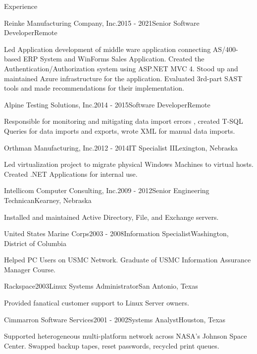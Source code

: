 \documentclass{resume} %
\begin{document}
\begin{rSection}{Experience}
\begin{rSubsection}{Reinke Manufacturing Company, Inc.}{2015 - 2021}{Senior Software Developer}{Remote} 
\item Led Application development of middle ware application connecting AS/400-based ERP System and WinForms Sales Application. Created the Authentication/Authorization system using ASP.NET MVC 4. Stood up and maintained Azure infrastructure for the application. Evaluated 3rd-part SAST tools and made recommendations for their implementation.
\end{rSubsection}

\begin{rSubsection}{Alpine Testing Solutions, Inc.}{2014 - 2015}{Software Developer}{Remote}
\item Responsible for monitoring and mitigating data import errors , created T-SQL Queries for data imports and exports, wrote XML for manual data imports.
\end{rSubsection}

\begin{rSubsection}{Orthman Manufacturing, Inc.}{2012 - 2014}{IT Specialist II}{Lexington, Nebraska}
\item Led virtualization project to migrate physical Windows Machines to virtual hosts. Created .NET Applications for internal use.
\end{rSubsection}

\begin{rSubsection}{Intellicom Computer Consulting, Inc.}{2009 - 2012}{Senior Engineering Technican}{Kearney, Nebraska}
\item Installed and maintained Active Directory, File, and Exchange servers. 
\end{rSubsection}

\begin{rSubsection}{United States Marine Corps}{2003 - 2008}{Information Specialist}{Washington, District of Columbia}
\item Helped PC Users on USMC Network. Graduate of USMC Information Assurance Manager Course.
\end{rSubsection}

\begin{rSubsection}{Rackspace}{2003}{Linux Systems Administrator}{San Antonio, Texas}
\item Provided fanatical customer support to Linux Server owners.
\end{rSubsection}

\begin{rSubsection}{Cimmarron Software Services}{2001 - 2002}{Systems Analyst}{Houston, Texas}
\item Supported heterogeneous multi-platform network across NASA's Johnson Space Center. Swapped backup tapes, reset passwords, recycled print queues.
\end{rSubsection}


\end{rSection}
\end{document}
